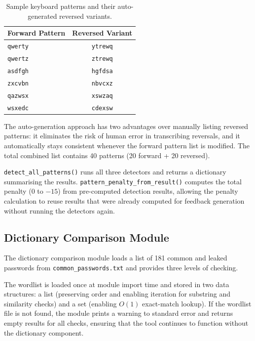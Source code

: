 \begin{table}[H]
\centering
\caption{Sample keyboard patterns and their auto-generated reversed variants.}
\label{tab:keyboard_patterns}
\begin{tabularx}{0.7\textwidth}{lc}
\toprule
\textbf{Forward Pattern} & \textbf{Reversed Variant} \\
\midrule
\texttt{qwerty}  & \texttt{ytrewq} \\
\texttt{qwertz}  & \texttt{ztrewq} \\
\texttt{asdfgh}  & \texttt{hgfdsa} \\
\texttt{zxcvbn}  & \texttt{nbvcxz} \\
\texttt{qazwsx}  & \texttt{xswzaq} \\
\texttt{wsxedc}  & \texttt{cdexsw} \\
\bottomrule
\end{tabularx}
\end{table}

The auto-generation approach has two advantages over manually listing reversed patterns: it eliminates the risk of human error in transcribing reversals, and it automatically stays consistent whenever the forward pattern list is modified. The total combined list contains 40 patterns (20 forward + 20 reversed).

\texttt{detect\_all\_patterns()} runs all three detectors and returns a dictionary summarising the results. \texttt{pattern\_penalty\_from\_result()} computes the total penalty ($0$ to $-15$) from pre-computed detection results, allowing the penalty calculation to reuse results that were already computed for feedback generation without running the detectors again.

\subsection{Dictionary Comparison Module}

The dictionary comparison module loads a list of 181 common and leaked passwords from \texttt{common\_passwords.txt} and provides three levels of checking.

The wordlist is loaded once at module import time and stored in two data structures: a list (preserving order and enabling iteration for substring and similarity checks) and a set (enabling $O(1)$ exact-match lookup). If the wordlist file is not found, the module prints a warning to standard error and returns empty results for all checks, ensuring that the tool continues to function without the dictionary component.

